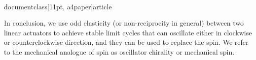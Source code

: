 \\documentclass[11pt, a4paper]{article} %
\begin{document}
    In conclusion, we use odd elasticity (or non-reciprocity in general) between two linear actuators to achieve stable limit cycles 
    that can oscillate either in clockwise or counterclockwise direction, and they can be used to replace the spin. We refer to the 
    mechanical analogue of spin as oscillator chirality or mechanical spin. 

    
        




\end{document}
